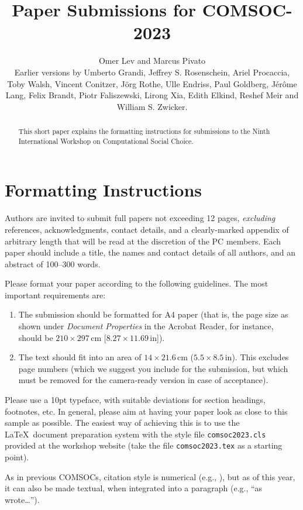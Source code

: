 \documentclass{comsoc2023}[a4paper]
\title{Paper Submissions for COMSOC-2023}
\author{Omer Lev and Marcus Pivato\\$ $ \\
\footnotesize{Earlier versions by Umberto Grandi, Jeffrey S. Rosenschein, Ariel Procaccia, Toby Walsh, Vincent Conitzer, J\"org Rothe, Ulle Endriss, Paul Goldberg, J\'er\^ome Lang, Felix Brandt, Piotr Faliszewski, Lirong Xia, Edith Elkind, Reshef Meir and William S. Zwicker.}}
\begin{document}

\begin{abstract}
 This short paper explains the formatting instructions for submissions to the Ninth International Workshop on Computational Social Choice.
\end{abstract}


\section{Formatting Instructions}

Authors are invited to submit full papers not exceeding 12 pages, \emph{excluding} references, acknowledgments, contact details, and a clearly-marked appendix of arbitrary length that will be read at the discretion of the PC members. Each paper should include a title, the names and contact details of all authors, and an abstract of 100--300 words.

Please format your paper according to the following guidelines. The most important requirements are:
\begin{enumerate}
\item The submission should be formatted for A4 paper (that is, the page size as shown under \emph{Document Properties} in the Acrobat Reader, for instance, should be $210\times297\,\mbox{cm}$ [$8.27\times 11.69\,\mbox{in}$]).
\item The text should fit into an area of $14\times 21.6\,\mbox{cm}$ ($5.5\times 8.5\,\mbox{in}$). This excludes page numbers (which we suggest you include for the submission, but which must be removed for the camera-ready version in case of acceptance).
\end{enumerate}

Please use a 10pt typeface, with suitable deviations for section headings, footnotes, etc. In general, please aim at having your paper look as close to this sample as possible. The easiest way of achieving this is to use the \LaTeX\ document preparation system with the style file \texttt{comsoc2023.cls} provided at the workshop website (take the file \texttt{comsoc2023.tex} as a starting point). 

As in previous COMSOCs, citation style is numerical (e.g., \cite{BCELP16}), but as of this year, it can also be made textual, when integrated into a paragraph (e.g., ``as \citet{Rot15} wrote\ldots'').
\end{document}
